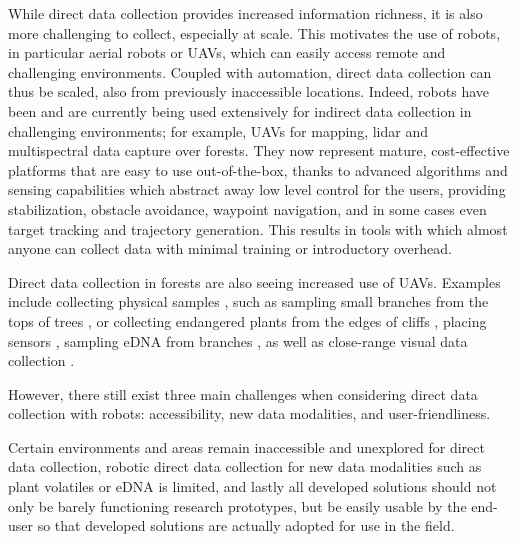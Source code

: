 While direct data collection provides increased information richness, it is also more challenging to collect, especially at scale. 
This motivates the use of robots, in particular aerial robots or UAVs, which can easily access remote and challenging environments. Coupled with automation, direct data collection can thus be scaled, also from previously inaccessible locations.
Indeed, robots have been and are currently being used extensively for indirect data collection in challenging environments; for example, UAVs for mapping, lidar and multispectral data capture over forests. They now represent mature, cost-effective platforms that are easy to use out-of-the-box, thanks to advanced algorithms and sensing capabilities which abstract away low level control for the users, providing stabilization, obstacle avoidance, waypoint navigation, and in some cases even target tracking and trajectory generation. This results in tools with which almost anyone can collect data with minimal training or introductory overhead. 







Direct data collection in forests are also seeing increased use of UAVs.
Examples include collecting physical samples \cite{Krasylenko2023}, such as sampling small branches from the tops of trees \cite{Charron2020}, or collecting endangered plants from the edges of cliffs \cite{LaVigne2022}, placing sensors \cite{Hamaza2020, Farinha2020}, sampling eDNA from branches \cite{Aucone2023a}, as well as close-range visual data collection \cite{Liu2022, Zhou2022}.

However, there still exist three main challenges when considering direct data collection with robots: accessibility, new data modalities, and user-friendliness.

Certain environments and areas remain inaccessible and unexplored for direct data collection, robotic direct data collection for new data modalities such as plant volatiles or eDNA is limited, and lastly all developed solutions should not only be barely functioning research prototypes, but be easily usable by the end-user so that developed solutions are actually adopted for use in the field.

